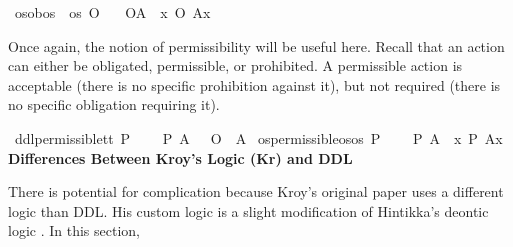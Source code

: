 \begin{isabellebody}
\isamarkupfalse%
\ os{\isacharunderscore}ob{\isacharcolon}{\isacharcolon}{\isachardoublequoteopen}os\ {\isasymRightarrow}\ os{\isachardoublequoteclose}\ {\isacharparenleft}{\isachardoublequoteopen}\isactrlemph O{\isacharbraceleft}{\isacharunderscore}{\isacharbraceright}{\isachardoublequoteclose}{\isacharparenright}\isanewline
\ \ \ {\isachardoublequoteopen}\isactrlemph O{\isacharbraceleft}A{\isacharbraceright}\ {\isasymequiv}\ {\isasymlambda}x{\isachardot}\ {\isacharparenleft}O\ {\isacharbraceleft}A{\isacharparenleft}x{\isacharparenright}{\isacharbraceright}{\isacharparenright}{\isachardoublequoteclose}%
\begin{isamarkuptext}%
Once again, the notion of permissibility will be useful here. Recall that an action can either be 
obligated, permissible, or prohibited. A permissible action is acceptable (there is no specific prohibition 
against it), but not required (there is no specific obligation requiring it).%
\end{isamarkuptext}\isamarkuptrue%
\isamarkupfalse%
\ ddl{\isacharunderscore}permissible{\isacharcolon}{\isacharcolon}{\isachardoublequoteopen}t{\isasymRightarrow}t{\isachardoublequoteclose}\ {\isacharparenleft}{\isachardoublequoteopen}P\ {\isacharbraceleft}{\isacharunderscore}{\isacharbraceright}{\isachardoublequoteclose}{\isacharparenright}\isanewline
\ \ \ {\isachardoublequoteopen}P\ {\isacharbraceleft}A{\isacharbraceright}\ {\isasymequiv}\ \isactrlbold {\isasymnot}\ {\isacharparenleft}O\ {\isacharbraceleft}\isactrlbold {\isasymnot}\ A{\isacharbraceright}{\isacharparenright}{\isachardoublequoteclose}\isanewline
{}\isamarkupfalse%
\ os{\isacharunderscore}permissible{\isacharcolon}{\isacharcolon}{\isachardoublequoteopen}os{\isasymRightarrow}os{\isachardoublequoteclose}\ {\isacharparenleft}{\isachardoublequoteopen}\isactrlemph P\ {\isacharbraceleft}{\isacharunderscore}{\isacharbraceright}{\isachardoublequoteclose}{\isacharparenright}\isanewline
\ \ \ {\isachardoublequoteopen}\isactrlemph P\ {\isacharbraceleft}A{\isacharbraceright}\ {\isasymequiv}\ {\isasymlambda}x{\isachardot}\ P\ {\isacharbraceleft}A{\isacharparenleft}x{\isacharparenright}{\isacharbraceright}{\isachardoublequoteclose}%
\textbf{Differences Between Kroy's Logic (Kr) and DDL}
%
\begin{isamarkuptext}%
There is potential for complication because Kroy's original paper uses a different logic than DDL. 
His custom logic is a slight modification of Hintikka's deontic logic \cite{hintikka}. In this section, 

\end{isamarkuptext}
\end{isabellebody}
